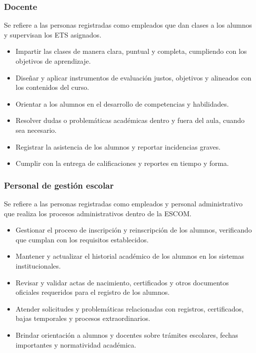 \begin{Usuario}{\hypertarget{tDocenteAplicador}{\subsubsection{Docente}}}{
    Se refiere a las personas registradas como empleados que dan clases a los alumnos y supervisan los ETS asignados.
}


\item[Responsabilidades:] \cdtEmpty
\begin{itemize}
    \item Impartir las clases de manera clara, puntual y completa, cumpliendo con los objetivos de aprendizaje.
    \item Diseñar y aplicar instrumentos de evaluación justos, objetivos y alineados con los contenidos del curso.
    \item Orientar a los alumnos en el desarrollo de competencias y habilidades.
    \item Resolver dudas o problemáticas académicas dentro y fuera del aula, cuando sea necesario.
    \item Registrar la asistencia de los alumnos y reportar incidencias graves.
    \item Cumplir con la entrega de calificaciones y reportes en tiempo y forma.
\end{itemize}
\end{Usuario}

\begin{Usuario}{\hypertarget{tPersonalGestion}{\subsubsection{Personal de gestión escolar}}}{
    Se refiere a las personas registradas como empleados y personal administrativo que realiza los procesos administrativos dentro de la ESCOM.
}
\item[Responsabilidades:] \cdtEmpty
\begin{itemize}
    \item Gestionar el proceso de inscripción y reinscripción de los alumnos, verificando que cumplan con los requisitos establecidos.
    \item Mantener y actualizar el historial académico de los alumnos en los sistemas institucionales.
    \item Revisar y validar actas de nacimiento, certificados y otros documentos oficiales requeridos para el registro de los alumnos.
    \item Atender solicitudes y problemáticas relacionadas con registros, certificados, bajas temporales y procesos extraordinarios.
    \item Brindar orientación a alumnos y docentes sobre trámites escolares, fechas importantes y normatividad académica.
\end{itemize}
\end{Usuario}

